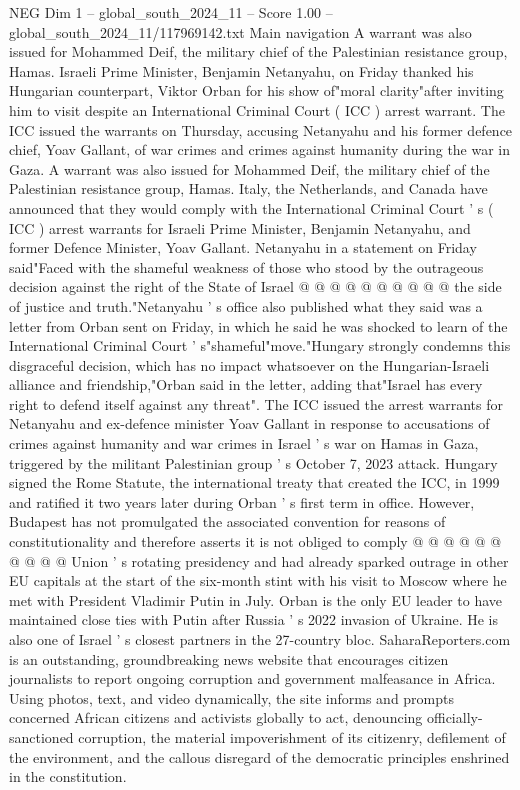 \begin{textsample}{NEG Dim 1 – global\_south\_2024\_11 – Score 1.00 – global\_south\_2024\_11/117969142.txt}  \label{ex:f1_neg_202}
Main navigation A warrant was also issued for Mohammed Deif, the military chief of the Palestinian resistance group, Hamas.
Israeli Prime Minister, Benjamin Netanyahu, on Friday thanked his Hungarian counterpart, Viktor Orban for his show of"moral clarity"after inviting him to visit despite an International Criminal Court ( ICC ) arrest warrant.
The ICC issued the warrants on Thursday, accusing Netanyahu and his former defence chief, Yoav Gallant, of war crimes and crimes against humanity during the war in Gaza.
A warrant was also issued for Mohammed Deif, the military chief of the Palestinian resistance group, Hamas.
Italy, the Netherlands, and Canada have announced that they would comply with the International Criminal Court ' s ( ICC ) arrest warrants for Israeli Prime Minister, Benjamin Netanyahu, and former Defence Minister, Yoav Gallant.
Netanyahu in a statement on Friday said"Faced with the shameful weakness of those who stood by the outrageous decision against the right of the State of Israel @ @ @ @ @ @ @ @ @ @ the side of justice and truth."Netanyahu ' s office also published what they said was a letter from Orban sent on Friday, in which he said he was shocked to learn of the International Criminal Court ' s"shameful"move."Hungary strongly condemns this disgraceful decision, which has no impact whatsoever on the Hungarian-Israeli alliance and friendship,"Orban said in the letter, adding that"Israel has every right to defend itself against any threat".
The ICC issued the arrest warrants for Netanyahu and ex-defence minister Yoav Gallant in response to accusations of crimes against humanity and war crimes in Israel ' s war on Hamas in Gaza, triggered by the militant Palestinian group ' s October 7, 2023 attack.
Hungary signed the Rome Statute, the international treaty that created the ICC, in 1999 and ratified it two years later during Orban ' s first term in office.
However, Budapest has not promulgated the associated convention for reasons of constitutionality and therefore asserts it is not obliged to comply @ @ @ @ @ @ @ @ @ @ Union ' s rotating presidency and had already sparked outrage in other EU capitals at the start of the six-month stint with his visit to Moscow where he met with President Vladimir Putin in July.
Orban is the only EU leader to have maintained close ties with Putin after Russia ' s 2022 invasion of Ukraine.
He is also one of Israel ' s closest partners in the 27-country bloc.
SaharaReporters.com is an outstanding, groundbreaking news website that encourages citizen journalists to report ongoing corruption and government malfeasance in Africa.
Using photos, text, and video dynamically, the site informs and prompts concerned African citizens and activists globally to act, denouncing officially-sanctioned corruption, the material impoverishment of its citizenry, defilement of the environment, and the callous disregard of the democratic principles enshrined in the constitution.

\end{textsample}
